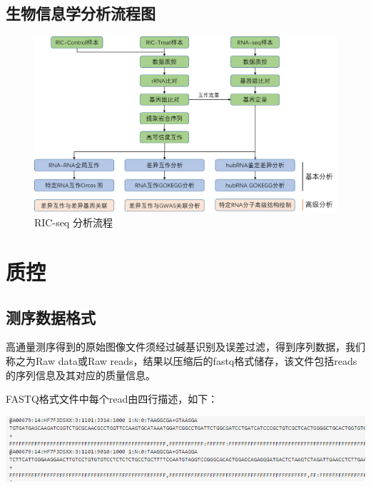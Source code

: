 \documentclass[
]{ctexart}
\begin{document}
\hypertarget{ux751fux7269ux4fe1ux606fux5b66ux5206ux6790ux6d41ux7a0bux56fe}{%
\subsection{生物信息学分析流程图}\label{ux751fux7269ux4fe1ux606fux5b66ux5206ux6790ux6d41ux7a0bux56fe}}

\begin{figure}[H]

{\centering \includegraphics[width=0.9\linewidth]{./1.picture/1.FlowChart} 

}

\caption{RIC-seq 分析流程}\label{fig:unnamed-chunk-3}
\end{figure}
\newpage

\hypertarget{ux8d28ux63a7}{%
\section{质控}\label{ux8d28ux63a7}}

\hypertarget{ux6d4bux5e8fux6570ux636eux683cux5f0f}{%
\subsection{测序数据格式}\label{ux6d4bux5e8fux6570ux636eux683cux5f0f}}

高通量测序得到的原始图像文件须经过碱基识别及误差过滤，得到序列数据，我们称之为Raw data或Raw reads，结果以压缩后的fastq格式储存，该文件包括reads的序列信息及其对应的质量信息。

FASTQ格式文件中每个read由四行描述，如下：

\begin{center}\includegraphics[width=1\linewidth]{./1.picture/2.1fastqFormat} \end{center}
\end{document}
